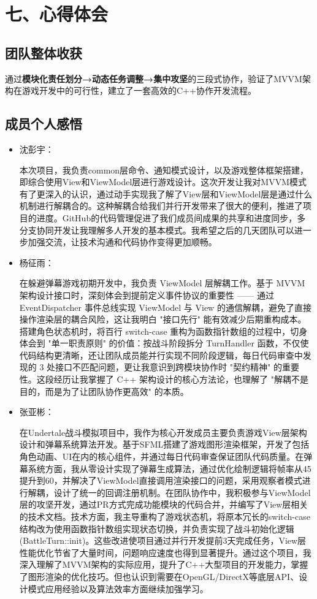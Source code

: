 \documentclass{article}
\begin{document}
\section{七、心得体会}


\subsection{团队整体收获}
通过\textbf{模块化责任划分→动态任务调整→集中攻坚}的三段式协作，验证了MVVM架构在游戏开发中的可行性，建立了一套高效的C++协作开发流程。


\subsection{成员个人感悟}
\begin{itemize}
    \item 沈彭宇：
    
    本次项目，我负责common层命令、通知模式设计，以及游戏整体框架搭建，即综合使用View和ViewModel层进行游戏设计。这次开发让我对MVVM模式有了更深入的认识，通过动手实现我了解了View层和ViewModel层是通过什么机制进行解耦合的。这种解耦合给我们并行开发带来了很大的便利，推进了项目的进度。GitHub的代码管理促进了我们成员间成果的共享和进度同步，多分支协同开发让我理解多人开发的基本模式。我希望之后的几天团队可以进一步加强交流，让技术沟通和代码协作变得更加顺畅。  

    \item 杨征雨：
    
    
    在躲避弹幕游戏初期开发中，我负责 ViewModel 层解耦工作。基于 MVVM 架构设计接口时，深刻体会到提前定义事件协议的重要性 —— 通过 EventDispatcher 事件总线实现 ViewModel 与 View 的通信解耦，避免了直接操作渲染层的耦合风险，这让我明白 "接口先行" 能有效减少后期重构成本。搭建角色状态机时，将百行 switch-case 重构为函数指针数组的过程中，切身体会到 "单一职责原则" 的价值：按战斗阶段拆分 TurnHandler 函数，不仅使代码结构更清晰，还让团队成员能并行实现不同阶段逻辑，每日代码审查中发现的 3 处接口不匹配问题，更让我意识到跨模块协作时 "契约精神" 的重要性。这段经历让我掌握了 C++ 架构设计的核心方法论，也理解了 "解耦不是目的，而是为了让团队协作更高效" 的本质。
    \item 张亚彬：
    
    在Undertale战斗模拟项目中，我作为核心开发成员主要负责游戏View层架构设计和弹幕系统算法开发。基于SFML搭建了游戏图形渲染框架，开发了包括角色动画、UI在内的核心组件，并通过每日代码审查保证团队代码质量。在弹幕系统方面，我从零设计实现了弹幕生成算法，通过优化绘制逻辑将帧率从45提升到60，并解决了ViewModel直接调用渲染接口的问题，采用观察者模式进行解耦，设计了统一的回调注册机制。在团队协作中，我积极参与ViewModel层的攻坚开发，通过PR方式完成功能模块的代码合并，并编写了View层相关的技术文档。技术方面，我主导重构了游戏状态机，将原本冗长的switch-case结构改为使用函数指针数组实现状态切换，并负责实现了战斗初始化逻辑(BattleTurn::init)。这些改进使项目通过并行开发提前3天完成任务，View层性能优化节省了大量时间，问题响应速度也得到显著提升。通过这个项目，我深入理解了MVVM架构的实际应用，提升了C++大型项目的开发能力，掌握了图形渲染的优化技巧。但也认识到需要在OpenGL/DirectX等底层API、设计模式应用经验以及算法效率方面继续加强学习。
\end{itemize}
\end{document}

